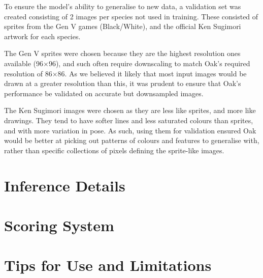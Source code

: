 \documentclass[onecolumn]{article}
\begin{document}
To ensure the model's ability to generalise to new data, a validation set was created consisting of 2 images per species not used in training. These consisted of sprites from the Gen V games (Black/White), and the official Ken Sugimori artwork for each species.

The Gen V sprites were chosen because they are the highest resolution ones available (96$\times$96), and such often require downscaling to match Oak's required resolution of 86$\times$86. As we believed it likely that most input images would be drawn at a greater resolution than this, it was prudent to ensure that Oak's performance be validated on accurate but downsampled images.

The Ken Sugimori images were chosen as they are less like sprites, and more like drawings. They tend to have softer lines and less saturated colours than sprites, and with more variation in pose. As such, using them for validation ensured Oak would be better at picking out patterns of colours and features to generalise with, rather than specific collections of pixels defining the sprite-like images.


\section*{Inference Details}

\section*{Scoring System}

\section*{Tips for Use and Limitations}




\end{document}
